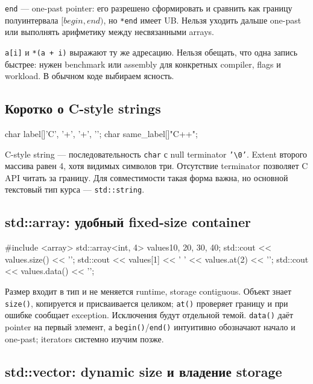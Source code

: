 \texttt{end} --- one-past pointer: его разрешено сформировать и сравнить как
границу полуинтервала $[begin,end)$, но \texttt{*end} имеет UB. Нельзя уходить
дальше one-past или выполнять арифметику между несвязанными arrays.

\begin{performancebox}
\texttt{a[i]} и \texttt{*(a + i)} выражают ту же адресацию. Нельзя обещать,
что одна запись быстрее: нужен benchmark или assembly для конкретных compiler,
flags и workload. В обычном коде выбираем ясность.
\end{performancebox}

\subsection{Коротко о C-style strings}

\begin{cppcode}
char label[]{'C', '+', '+', '\0'};
char same_label[]{"C++"};
\end{cppcode}

C-style string --- последовательность \texttt{char} с null terminator
\texttt{'\textbackslash 0'}. Extent второго массива равен 4, хотя видимых
символов три. Отсутствие terminator позволяет C API читать за границу. Для
совместимости такая форма важна, но основной текстовый тип курса ---
\texttt{std::string}.

\subsection{std::array: удобный fixed-size container}

\begin{cppcode}
#include <array>
std::array<int, 4> values{10, 20, 30, 40};
std::cout << values.size() << '\n';
std::cout << values[1] << ' ' << values.at(2) << '\n';
std::cout << values.data() << '\n';
\end{cppcode}

Размер входит в тип и не меняется runtime, storage contiguous.
Объект знает \texttt{size()}, копируется и присваивается целиком;
\texttt{at()} проверяет границу и при ошибке сообщает exception. Исключения
будут отдельной темой. \texttt{data()} даёт pointer на первый элемент, а
\texttt{begin()}/\texttt{end()} интуитивно обозначают начало и one-past;
iterators системно изучим позже.

\subsection{std::vector: dynamic size и владение storage}

